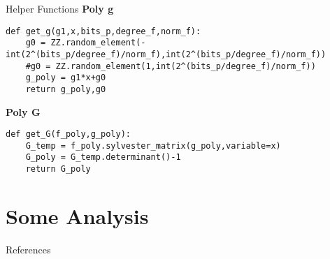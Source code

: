 \documentclass[10pt]{beamer}
\begin{document}
\begin{frame}[fragile]{Helper Functions}
\textbf{Poly g}
 \begin{lstlisting}
def get_g(g1,x,bits_p,degree_f,norm_f):
    g0 = ZZ.random_element(-int(2^(bits_p/degree_f)/norm_f),int(2^(bits_p/degree_f)/norm_f))
    #g0 = ZZ.random_element(1,int(2^(bits_p/degree_f)/norm_f))
    g_poly = g1*x+g0
    return g_poly,g0
        \end{lstlisting}
\textbf{Poly G}
\begin{lstlisting}
def get_G(f_poly,g_poly):
    G_temp = f_poly.sylvester_matrix(g_poly,variable=x)
    G_poly = G_temp.determinant()-1
    return G_poly   
\end{lstlisting}
\end{frame}

%
%
\section{Some Analysis}

\begin{frame}[allowframebreaks]{References}

  
  

\end{frame}
\end{document}
